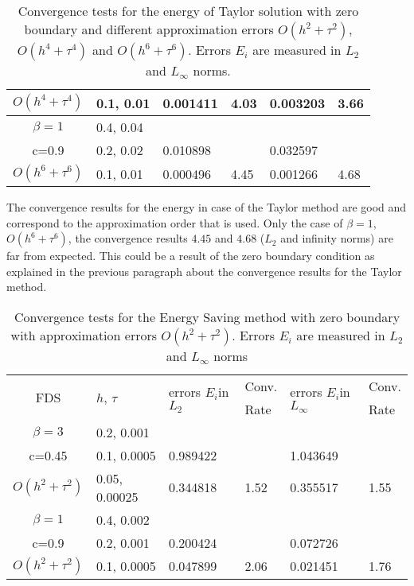 \documentclass[%
 aip,
cp,  %
 amsmath,amssymb,%
 reprint,%
]{revtex4-2}
\begin{document}
\begin{table}[ht]
\begin{tabular}{||c|l|ll|ll||}
       $O(h^4+ \tau^4)$ &0.1, 0.01   &0.001411 & 4.03   & 0.003203  & 3.66  \\
    \hline
  $\beta=1$     &0.4, 0.04   &            &          &                  &      \\
      c=0.9                    &0.2, 0.02   &0.010898 &           & 0.032597      &       \\
     $O(h^6+ \tau^6)$ &0.1, 0.01 & 0.000496 &4.45 & 0.001266  & 4.68        \\
	   \hline
			\hline 
		\end{tabular}
		\caption{Convergence tests for the energy of Taylor solution with zero boundary and different approximation errors $O(h^{2} + \tau^2 )$, $O(h^{4} + \tau^4 )$ and $O(h^{6} + \tau^6 )$. Errors $E_i$ are measured in $L_2$ and $L_\infty$ norms.}
\label{table:B}
\end{table}
 
The convergence results for the energy in case of the Taylor method are good and correspond to the approximation order that is used. Only the case of $\beta = 1$, $O(h^6 + \tau^6)$, the convergence results $4.45$ and $4.68$ ($L_2$ and infinity norms) are far from expected. This could be a result of the zero boundary condition as explained in the previous paragraph about the convergence results for the Taylor method.

\begin{table}[ht]
\centering
\small
		\begin{tabular}{||c|l|ll|ll||}
			\hline
			\hline
      \multirow{2  }{*}{FDS}        & \multirow{2  }{*}{$h$, $\tau$}  & \multirow{2  }{*}{errors $E_i$in$L_2$}  &Conv.& \multirow{2  }{*}{errors $E_i$in$L_\infty$}  &Conv.  \\
	                                        &                                                     &                                                                 &  Rate &                                                                       & Rate \\
   			\hline 
					\hline 
  $\beta=3$                &0.2, 0.001         &                    &                &                  &                   \\
   c=0.45                     &0.1, 0.0005         & 0.989422   &                & 1.043649  &                   \\
     $O(h^2 + \tau^ 2)$ &0.05, 0.00025  &0.344818    & 1.52       & 0.355517   &   1.55   \\
	   \hline
			\hline 
       $\beta=1$           & 0.4, 0.002       &                   &           &                 &   \\
                  c=0.9       & 0.2, 0.001        & 0.200424   &          &0.072726  &   \\
  $O(h^2+ \tau^2)$  & 0.1, 0.0005       & 0.047899   & 2.06  &0.021451  & 1.76 \\
	   \hline
			\hline 
		\end{tabular}
		\caption{Convergence tests for the Energy Saving method with zero boundary with approximation errors $O(h^{2} + \tau^2 )$. Errors $E_i$ are measured in $L_2$ and $L_\infty$ norms}
\label{tableC}
\end{table}
\end{document}

